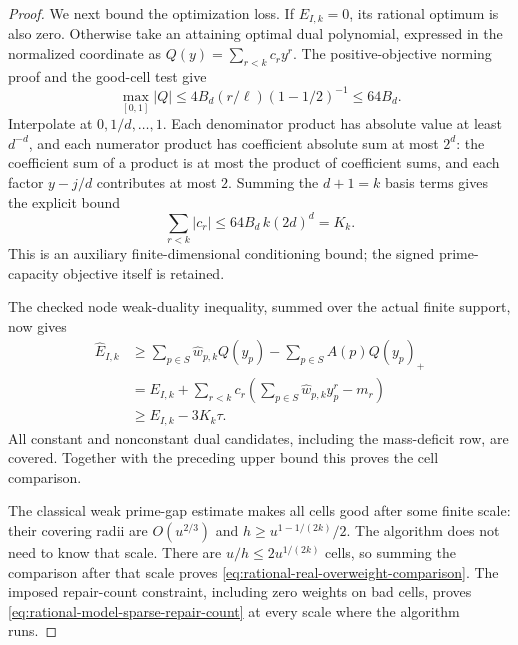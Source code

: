 \documentclass[11pt]{article}
\theoremstyle{definition}
\begin{document}
\begin{proof}
We next bound the optimization loss. If $E_{I,k}=0$, its
rational optimum is also zero. Otherwise take an attaining
optimal dual polynomial, expressed in the normalized coordinate
as $Q(y)=\sum_{r<k}c_r y^r$. The positive-objective norming
proof and the good-cell test give
\[
 \max_{[0,1]}|Q|\le
       4B_d(r/\ell)(1-1/2)^{-1}\le64B_d.
\]
Interpolate at $0,1/d,\ldots,1$.
Each denominator product has absolute value at least $d^{-d}$,
and each numerator product has coefficient absolute sum at most
$2^d$: the coefficient sum of a product is at most the product
of coefficient sums, and each factor $y-j/d$ contributes at
most $2$. Summing the $d+1=k$ basis terms gives the explicit bound
\begin{equation}
 \sum_{r<k}|c_r|\le
       64B_d\,k(2d)^d=K_k .
 \label{eq:rational-model-dual-coefficient-budget}
\end{equation}
This is an auxiliary finite-dimensional conditioning bound;
the signed prime-capacity objective itself is retained.

The checked node weak-duality inequality, summed over the
actual finite support, now gives
\begin{align*}
 \widehat E_{I,k}
 &\ge\sum_{p\in S}\widehat w_{p,k}Q(y_p)
                         -\sum_{p\in S}A(p)Q(y_p)_+\\
 &=E_{I,k}+
       \sum_{r<k}c_r
          \left(\sum_{p\in S}\widehat w_{p,k}y_p^r-m_r\right)\\
 &\ge E_{I,k}-3K_k\tau .
\end{align*}
All constant and nonconstant dual candidates, including the
mass-deficit row, are covered. Together with the preceding
upper bound this proves the cell comparison.

The classical weak prime-gap estimate makes all cells good
after some finite scale: their covering radii are
$O(u^{2/3})$ and $h\ge u^{1-1/(2k)}/2$.
The algorithm does not need to know that scale.
There are $u/h\le2u^{1/(2k)}$ cells, so summing the comparison
after that scale proves
\eqref{eq:rational-real-overweight-comparison}.
The imposed repair-count constraint, including zero weights
on bad cells, proves \eqref{eq:rational-model-sparse-repair-count}
at every scale where the algorithm runs.


\end{proof}
\end{document}
